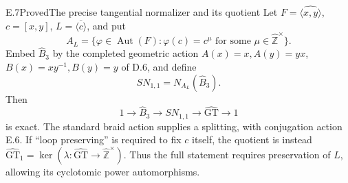 \begin{statement}{E.7}{Proved}{The precise tangential normalizer and its quotient}
Let $F=\widehat{\langle x,y\rangle}$, $c=[x,y]$, $L=\overline{\langle c\rangle}$,
and put
\[
 A_L=\{\varphi\in\operatorname{Aut}(F):\varphi(c)=c^\mu
                 \text{ for some }\mu\in\widehat{\mathbb Z}^{\times}\}.
\]
Embed $\widehat B_3$ by the completed geometric action
$A(x)=x,A(y)=yx$, $B(x)=xy^{-1},B(y)=y$ of D.6, and define
\[
 SN_{1,1}=N_{A_L}(\widehat B_3).
\]
Then
\[
 1\to\widehat B_3\to SN_{1,1}\to\widehat{\mathrm{GT}}\to1
\]
is exact.  The standard braid action supplies a splitting, with
conjugation action E.6.  If ``loop preserving'' is required to fix
$c$ itself, the quotient is instead
$\widehat{\mathrm{GT}}_1=\ker(\lambda:\widehat{\mathrm{GT}}
\to\widehat{\mathbb Z}^{\times})$.  Thus the full statement requires
preservation of $L$, allowing its cyclotomic power automorphisms.
\end{statement}
